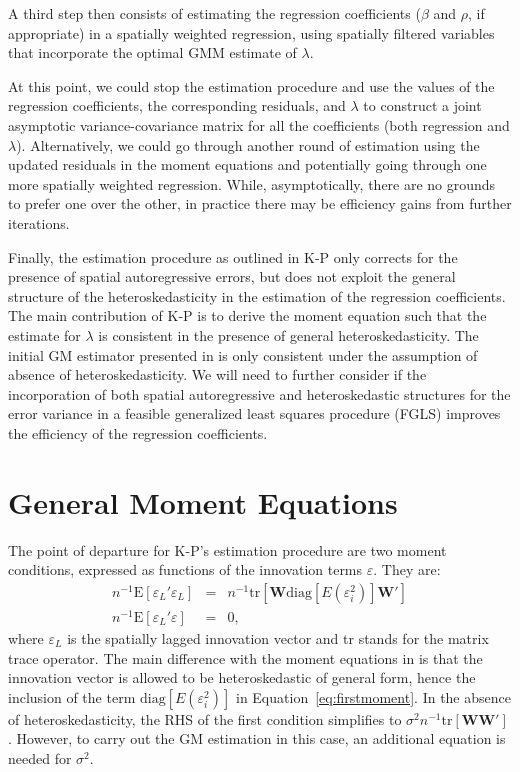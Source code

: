 \documentclass{article}
\begin{document}
A third step then consists of estimating the regression coefficients ($\beta$ and $\rho$, if
appropriate) in a spatially weighted regression, using spatially filtered variables that incorporate the
optimal GMM estimate of $\lambda$.

At this point, we could stop the estimation procedure and use the values of the regression
coefficients, the corresponding residuals, and $\lambda$ to construct a joint asymptotic 
variance-covariance matrix for all the coefficients (both regression and $\lambda$).
Alternatively, we could go through another round of estimation using the updated residuals
in the moment equations and potentially going through one more spatially weighted 
regression. While, asymptotically, there are no grounds to prefer one over the other, in
practice there may be efficiency gains from further iterations.

Finally, the estimation procedure as outlined in K-P only corrects for the presence of
spatial autoregressive errors, but does not exploit the general structure of the 
heteroskedasticity in the estimation of the regression coefficients. The main contribution
of K-P is to derive the moment equation such that the estimate for $\lambda$ is
consistent in the presence of general heteroskedasticity. The initial GM estimator presented
in \cite{KelejianPrucha:98,KelejianPrucha:99a} is only consistent under the assumption
of absence of heteroskedasticity. We will need to further consider if the incorporation of
both spatial autoregressive and heteroskedastic structures for the error variance 
in a feasible generalized least squares procedure (FGLS)
improves the efficiency of the regression coefficients.

\section{General Moment Equations}
The point of departure for K-P's estimation procedure are two 
moment conditions, expressed as functions of the innovation terms
$\varepsilon$. They are:
\begin{eqnarray}
 n^{-1} \mbox{E} [\varepsilon_L'\varepsilon_L] &=& n^{-1} \mbox{tr} [ \mathbf{W} \mbox{diag}[E(\varepsilon_i^2)] \mathbf{W'} ] \label{eq:firstmoment}\\ 
 n^{-1} \mbox{E} [\varepsilon_L'\varepsilon] &=& 0,
\end{eqnarray}
where $\varepsilon_L$ is the spatially lagged innovation vector and tr stands for the
matrix trace operator. The main difference
with the moment equations in \cite{KelejianPrucha:99a} is that the innovation vector
is allowed to be heteroskedastic of general form, hence the inclusion of the 
term $\mbox{diag}[E(\varepsilon_i^2)]$ in Equation~\ref{eq:firstmoment}. In the absence of heteroskedasticity, the
RHS of the first condition simplifies to $\sigma^2 n^{-1} \mbox{tr} [\mathbf{WW'}]$. However, to carry out the
GM estimation in this case, an additional equation is needed for $\sigma^2$.
\end{document}
